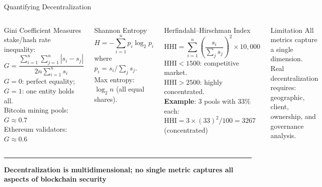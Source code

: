 \documentclass[8pt,aspectratio=169]{beamer}
\newcommand{\bottomnote}[1]{\vfill\vspace{-2mm}\textcolor{mllavender2}{\rule{\textwidth}{0.4pt}}\vspace{1mm}\footnotesize\textbf{#1}}
\begin{document}
\begin{frame}{Quantifying Decentralization}
\begin{columns}
\begin{block}{Gini Coefficient}
Measures stake/hash rate inequality:
\[G = \frac{\sum_{i=1}^n\sum_{j=1}^n |s_i-s_j|}{2n\sum_{i=1}^n s_i}\]
$G=0$: perfect equality; $G=1$: one entity holds all.\\[4pt]
Bitcoin mining pools: $G\approx 0.7$\\
Ethereum validators: $G\approx 0.6$
\end{block}
\vspace{2mm}
\begin{block}{Shannon Entropy}
\[H = -\sum_{i=1}^n p_i \log_2 p_i\]
where $p_i = s_i / \sum_j s_j$.\\
Max entropy: $\log_2 n$ (all equal shares).
\end{block}
\begin{block}{Herfindahl--Hirschman Index}
\[\text{HHI} = \sum_{i=1}^n \left(\frac{s_i}{\sum_j s_j}\right)^2 \times 10{,}000\]
$\text{HHI} < 1500$: competitive market.\\
$\text{HHI} > 2500$: highly concentrated.\\[6pt]
\textbf{Example}: 3 pools with 33\% each:\\
$\text{HHI} = 3\times(33)^2/100 = 3267$ (concentrated)
\end{block}
\vspace{2mm}
\begin{alertblock}{Limitation}
\small All metrics capture a single dimension. Real decentralization requires: geographic, client, ownership, and governance analysis.
\end{alertblock}
\end{columns}
\bottomnote{Decentralization is multidimensional; no single metric captures all aspects of blockchain security}
\end{frame}
\end{document}
